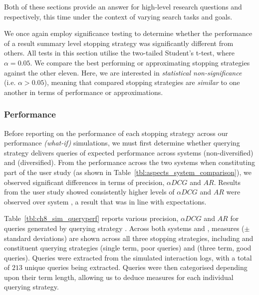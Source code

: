 Both of these sections provide an answer for high-level research questions  and  respectively, this time under the context of varying search tasks and goals.

We once again employ significance testing to determine whether the performance of a result summary level stopping strategy was significantly different from others. All tests in this section utilise the two-tailed Student's t-test, where $\alpha=0.05$. We compare the best performing or approximating stopping strategies against the other eleven. Here, we are interested in \emph{statistical non-significance} (i.e. $\alpha > 0.05$), meaning that compared stopping strategies are \emph{similar} to one another in terms of performance or approximations.

\subsubsection{Performance}\label{sec:diversity:simulated:results:perf}
\vspace*{-3mm}
Before reporting on the performance of each stopping strategy across our performance \emph{(what-if)} simulations, we must first determine whether querying strategy  delivers queries of expected performance across systems  (non-diversified) and  (diversified). From the performance across the two systems when constituting part of the user study (as shown in Table~\ref{tbl:aspects_system_comparison}), we observed significant differences in terms of precision, $\alpha DCG$ and $AR$. Results from the user study showed consistently higher levels of $\alpha DCG$ and $AR$ were observed over system , a result that was in line with expectations.

Table~\ref{tbl:ch8_sim_queryperf} reports various precision, $\alpha DCG$ and $AR$ for queries generated by querying strategy . Across both systems  and , measures ($\pm$ standard deviations) are shown across all three stopping strategies, including  and constituent querying strategies  (single term, poor queries) and  (three term, good queries). Queries were extracted from the simulated interaction logs, with a total of $213$ unique queries being extracted. Queries were then categorised depending upon their term length, allowing us to deduce measures for each individual querying strategy.

